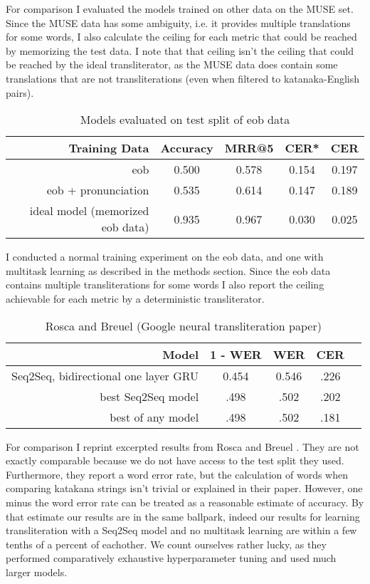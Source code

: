 \documentclass{article}
\begin{document}
For comparison I evaluated the models trained on other data on the MUSE set.
Since the MUSE data has some ambiguity,
i.e. it provides multiple translations for some words,
I also calculate the ceiling for each metric
that could be reached by memorizing the test data.
I note that that ceiling isn't
the ceiling that could be reached by the ideal transliterator,
as the MUSE data does contain some translations that are not transliterations
(even when filtered to katanaka-English pairs).

\begin{table}[h]
  \centering
  \begin{tabular}{r | c c c c}
    Training Data & Accuracy & MRR@5 & CER* & CER \\
    \midrule
    eob & 0.500 & 0.578 & 0.154 & 0.197 \\
    eob + pronunciation & 0.535 & 0.614 & 0.147 & 0.189 \\
    \midrule
    ideal model (memorized eob data) & 0.935 & 0.967 & 0.030 & 0.025 \\
  \end{tabular}
  \caption{Models evaluated on test split of eob data}
\end{table}

I conducted a normal training experiment on the eob data,
and one with multitask learning as described in the methods section.
Since the eob data contains multiple transliterations for some words
I also report the ceiling achievable for each metric
by a deterministic transliterator.

\begin{table}[h]
  \centering
  \begin{tabular}{r | c c c c}
    Model & 1 - WER & WER & CER \\
    \midrule
    Seq2Seq, bidirectional one layer GRU & 0.454 & 0.546 & .226 \\
    best Seq2Seq model & .498 & .502 & .202 \\
    best of any model & .498 & .502 & .181 \\
  \end{tabular}
  \caption{Rosca and Breuel \cite{Rosca2016SequencetosequenceNN} (Google neural
    transliteration paper)}
\end{table}

For comparison I reprint excerpted results
from Rosca and Breuel \cite{Rosca2016SequencetosequenceNN}.
They are not exactly comparable
because we do not have access to the test split they used.
Furthermore,
they report a word error rate,
but the calculation of words when comparing katakana strings
isn't trivial or explained in their paper.
However,
one minus the word error rate
can be treated as a reasonable estimate of accuracy.
By that estimate our results are in the same ballpark,
indeed our results for learning transliteration
with a Seq2Seq model and no multitask learning
are within a few tenths of a percent of eachother.
We count ourselves rather lucky,
as they performed comparatively exhaustive hyperparameter tuning
and used much larger models.
\end{document}
